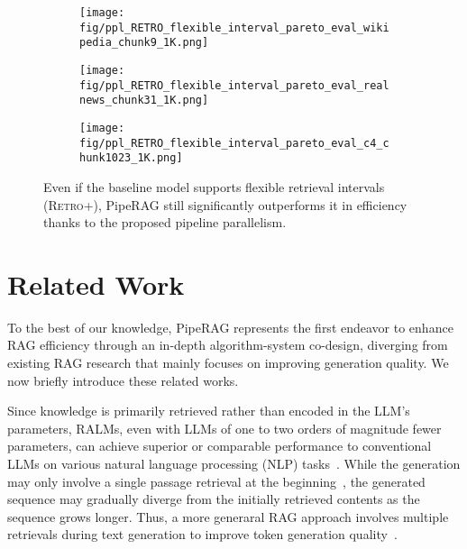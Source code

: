 \begin{figure}[t]

\begin{subfigure}
    \centering
    \texttt{[image: fig/ppl\_RETRO\_flexible\_interval\_pareto\_eval\_wikipedia\_chunk9\_1K.png]}
\end{subfigure}
\hfill
\begin{subfigure}
    \centering
    \texttt{[image: fig/ppl\_RETRO\_flexible\_interval\_pareto\_eval\_realnews\_chunk31\_1K.png]}
\end{subfigure}
\hfill
\begin{subfigure}
    \centering
    \texttt{[image: fig/ppl\_RETRO\_flexible\_interval\_pareto\_eval\_c4\_chunk1023\_1K.png]}
\end{subfigure}

  \vspace{-1em}
  \caption{Even if the baseline model supports flexible retrieval intervals (\textsc{Retro+}), PipeRAG still significantly outperforms it in efficiency thanks to the proposed pipeline parallelism.}
  \vspace{-1em}
  \label{fig:eval_e2e_retro_flexible_interval}
\end{figure}

\section{Related Work}

To the best of our knowledge, PipeRAG represents the first endeavor to enhance RAG efficiency through an in-depth algorithm-system co-design, diverging from existing RAG research that mainly focuses on improving generation quality. We now briefly introduce these related works.

Since knowledge is primarily retrieved rather than encoded in the LLM's parameters, RALMs, even with LLMs of one to two orders of magnitude fewer parameters, can achieve superior or comparable performance to conventional LLMs on various natural language processing (NLP) tasks~\cite{lewis2020pre, izacard2022few, komeili2021internet, guu2020retrieval}. While the generation may only involve a single passage retrieval at the beginning~\cite{lewis2020retrieval, izacard2020leveraging, sachan2021end}, the generated sequence may gradually diverge from the initially retrieved contents as the sequence grows longer. Thus, a more generaral RAG approach involves multiple retrievals during text generation to improve token generation quality~\cite{ram2023context, borgeaud2022improving}.

